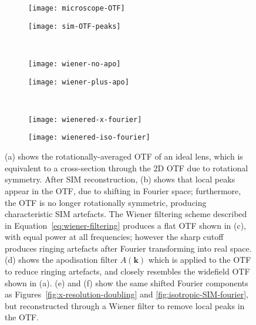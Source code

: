 \begin{figure}[tbp]
\centering
\begin{subfigure}[b]{0.49\textwidth}
	\texttt{[image: microscope-OTF]}
	\caption{}\label{fig:microscope-OTF}
\end{subfigure}
\hfill
\begin{subfigure}[b]{0.49\textwidth}
	\texttt{[image: sim-OTF-peaks]}
	\caption{}\label{fig:OTF-sim-peaks}
\end{subfigure}

~\newline
\begin{subfigure}[b]{0.49\textwidth}
	\texttt{[image: wiener-no-apo]}
	\caption{}\label{fig:wiener-no-apo}
\end{subfigure}
\hfill
\begin{subfigure}[b]{0.49\textwidth}
	\texttt{[image: wiener-plus-apo]}
	\caption{}\label{fig:wiener-plus-apo}
\end{subfigure}

~\newline
\begin{subfigure}[b]{0.49\textwidth}
	\texttt{[image: wienered-x-fourier]}
	\caption{}\label{fig:wienered-x-fourier}
\end{subfigure}
\hfill
\begin{subfigure}[b]{0.49\textwidth}
	\texttt{[image: wienered-iso-fourier]}
	\caption{}\label{fig:wienered-iso-fourier}
\end{subfigure}
\caption[LAG SIM: Wiener filtering of the SIM OTF is required for artefact-free reconstruction]{(a) shows the rotationally-averaged OTF of an ideal lens, which is equivalent to a cross-section through the 2D OTF due to rotational symmetry. After SIM reconstruction, (b) shows that local peaks appear in the OTF, due to shifting in Fourier space; furthermore, the OTF is no longer rotationally symmetric, producing characteristic SIM artefacts. The Wiener filtering scheme described in Equation~\ref{eq:wiener-filtering} produces a flat OTF shown in (c), with equal power at all frequencies; however the sharp cutoff produces ringing artefacts after Fourier transforming into real space. (d) shows the apodisation filter $A\left(\textbf{k}\right)$ which is applied to the OTF to reduce ringing artefacts, and closely resembles the widefield OTF shown in (a). (e) and (f) show the same shifted Fourier components as Figures~\ref{fig:x-resolution-doubling} and \ref{fig:isotropic-SIM-fourier}, but reconstructed through a Wiener filter to remove local peaks in the OTF.}
\label{fig:sim-OTFs}
\end{figure}

